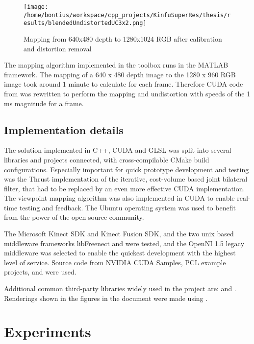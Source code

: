 \documentclass{ucl_thesis}
\begin{document}
\begin{figure}[h!]\centering
        \texttt{[image: /home/bontius/workspace/cpp\_projects/KinfuSuperRes/thesis/results/blendedUndistortedUC3x2.png]}
        \caption{Mapping from 640x480 depth to 1280x1024 RGB after calibration and distortion removal}
        \label{fig:final_calib}
\end{figure}

\par The mapping algorithm implemented in the toolbox runs in the MATLAB framework. The mapping of a 640 x 480 depth image to the 1280 x 960 RGB image took around 1 minute to calculate for each frame. Therefore CUDA code from \citep{kinect_lua} was rewritten to perform the mapping and undistortion with speeds of the 1 ms magnitude for a frame.

\section{Implementation details}
\label{sec:implementation_details}

\par The solution implemented in C++, CUDA and GLSL was split into several libraries and projects connected, with cross-compilable CMake build configurations. Especially important for quick prototype development and testing was the Thrust implementation of the iterative, cost-volume based joint bilateral filter, that had to be replaced by an even more effective CUDA implementation. The viewpoint mapping algorithm was also implemented in CUDA to enable real-time testing and feedback. The Ubuntu operating system was used to benefit from the power of the open-source community.

\par The Microsoft Kinect SDK and Kinect Fusion SDK, and the two unix based middleware frameworks libFreenect and \citep{openni} were tested, and the OpenNI 1.5 legacy middleware was selected to enable the quickest development with the highest level of service. Source code from NVIDIA CUDA Samples, PCL example projects, \citep{DCBGridStereo} and \citep{kinect_lua} were used.

\par Additional common third-party libraries widely used in the project are: \citep{opencv} and \citep{libeigen}. Renderings shown in the figures in the document were made using \citep{Meshlab}.

\chapter{Experiments}
\label{chp:validation}
\end{document}
